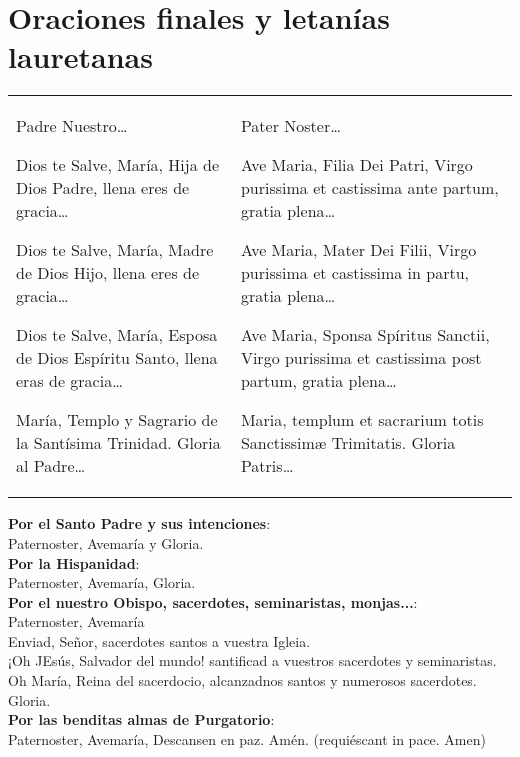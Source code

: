 \documentclass[./rosary.tex]{subfiles}
\begin{document}
\section*{Oraciones finales y letanías lauretanas}
\label{sec:final-prayer}

\begin{longtable} { p{} p{} }
    Padre Nuestro{\ldots}

    Dios te Salve, María, Hija de Dios Padre, llena eres de gracia{\ldots}

    Dios te Salve, María, Madre de Dios Hijo, llena eres de gracia{\ldots}

    Dios te Salve, María, Esposa de Dios Espíritu Santo, llena eras de gracia{\ldots}

    María, Templo y Sagrario de la Santísima Trinidad. Gloria al Padre{\ldots}

     &

    Pater Noster{\ldots}

    Ave Maria, Filia Dei Patri, Virgo purissima et castissima ante partum, gratia plena{\ldots}

    Ave Maria, Mater Dei Filii, Virgo purissima et castissima in partu, gratia plena{\ldots}

    Ave Maria, Sponsa Spíritus Sanctii, Virgo purissima et castissima post partum, gratia plena{\ldots}

    Maria, templum et sacrarium totis Sanctissimæ Trimitatis. Gloria Patris{\ldots}
\end{longtable}

\noindent\textbf{Por el Santo Padre y sus intenciones}:\\
{\indent}Paternoster, Avemaría y Gloria.\\
\noindent\textbf{Por la Hispanidad}:\\ 
{\indent}Paternoster, Avemaría, Gloria.\\
\noindent\textbf{Por el nuestro Obispo, sacerdotes, seminaristas, monjas...}:\\ 
{\indent}Paternoster, Avemaría\\
{\indent}Enviad, Señor, sacerdotes santos a vuestra Igleia.\\
{\indent}¡Oh JEsús, Salvador del mundo! santificad a vuestros sacerdotes y seminaristas.\\
{\indent}Oh María, Reina del sacerdocio, alcanzadnos santos y numerosos sacerdotes.\\
{\indent}Gloria.\\
\noindent\textbf{Por las benditas almas de Purgatorio}:\\
{\indent}Paternoster, Avemaría, Descansen en paz. Amén. (requiéscant in pace. Amen)
\end{document}

